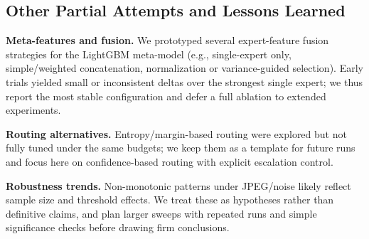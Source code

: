 \subsection*{Other Partial Attempts and Lessons Learned}

\textbf{Meta\hyp features and fusion.} We prototyped several expert\hyp feature fusion strategies for the LightGBM meta\hyp model (e.g., single\hyp expert only, simple/weighted concatenation, normalization or variance\hyp guided selection). Early trials yielded small or inconsistent deltas over the strongest single expert; we thus report the most stable configuration and defer a full ablation to extended experiments.

\textbf{Routing alternatives.} Entropy/margin\hyp based routing were explored but not fully tuned under the same budgets; we keep them as a template for future runs and focus here on confidence\hyp based routing with explicit escalation control.

\textbf{Robustness trends.} Non\hyp monotonic patterns under JPEG/noise likely reflect sample size and threshold effects. We treat these as hypotheses rather than definitive claims, and plan larger sweeps with repeated runs and simple significance checks before drawing firm conclusions.

